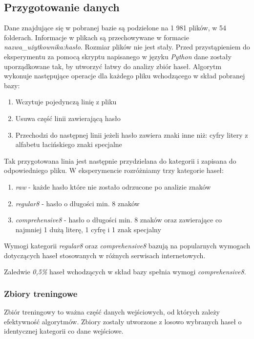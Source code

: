 \documentclass{article}
\begin{document}
	\subsection{Przygotowanie danych}
	Dane znajdujące się w pobranej bazie są podzielone na 1 981 plików, w 54 folderach. Informacje w plikach są przechowywane w formacie \textit{nazwa\_użytkownika:hasło}. Rozmiar plików nie jest stały. Przed przystąpieniem do eksperymentu za pomocą skryptu napisanego w języku \textit{Python} dane zostały uporządkowane tak, by utworzyć łatwy do analizy zbiór haseł. Algorytm wykonuje następujące operacje dla każdego pliku wchodzącego w skład pobranej bazy:
	\begin{enumerate}
		\item Wczytuje pojedynczą linię z pliku
		\item Usuwa część linii zawierającą hasło
		\item Przechodzi do następnej linii jeżeli hasło zawiera znaki inne niż:
			\subitem cyfry
			\subitem litery z alfabetu łacińskiego
			\subitem znaki specjalne	
	\end{enumerate}	
	Tak przygotowana linia jest następnie przydzielana do kategorii i zapisana do odpowiedniego pliku. W eksperymencie rozróżniamy trzy kategorie haseł:
	\begin{enumerate}
		\item \textit{raw} - każde hasło które nie zostało odrzucone po analizie znaków
		\item \textit{regular8} - hasło o długości min. 8 znaków
		\item \textit{comprehensive8} - hasło o długości min. 8 znaków oraz zawierające co najmniej 1 dużą literę, 1 cyfrę i 1 znak specjalny
	\end{enumerate}
	Wymogi kategorii \textit{regular8} oraz \textit{comprehensive8} bazują na popularnych wymogach dotyczących haseł stosowanych w różnych serwisach internetowych. 
	
	Zaledwie \textit{0,5\%} haseł wchodzących w skład bazy spełnia wymogi \textit{comprehensive8}.
	
	
	\subsubsection{Zbiory treningowe}
	Zbiór treningowy to ważna część danych wejściowych, od których zależy efektywność algorytmów. Zbiory zostały utworzone z losowo wybranych haseł o identycznej kategorii co dane wejściowe. %
	
\end{document}
